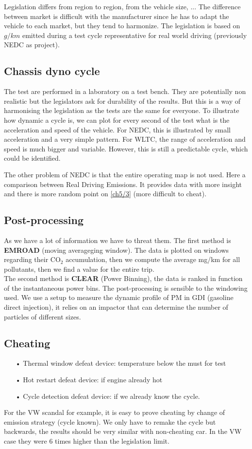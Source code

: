 	Legislation differs from region to region, from the vehicle size, ... The difference between market is difficult with the manufacturer since he has to adapt the vehicle to each market, but they tend to harmonize. The legislation is based on $g/km$ emitted during a test cycle representative for real world driving (previously NEDC as project). 
	
\subsection{Chassis dyno cycle}
		The test are performed in a laboratory on a test bench. They are potentially non realistic but the legislators ask for durability of the results. But this is a way of harmonising the legislation as the tests are the same for everyone. To illustrate how dynamic a cycle is, we can plot for every second of the test what is the acceleration and speed of the vehicle. For NEDC, this is illustrated by small acceleration and a very simple pattern. For WLTC, the range of acceleration and speed is much bigger and variable. However, this is still a predictable cycle, which could be identified.
		
		The other problem of NEDC is that the entire operating map is not used. Here a comparison between Real Driving Emissions. It provides data with more insight and there is more random point on \autoref{ch5/3} (more difficult to cheat).
		
\subsection{Post-processing}
	As we have a lot of information we have to threat them. The first method is \textbf{EMROAD} (moving averageging window). The data is plotted on windows regarding their CO$_2$ accumulation, then we compute the average mg/km for all pollutants, then we find a value for the entire trip. \\
	
	The second method is \textbf{CLEAR} (Power Binning), the data is ranked in function of the instantaneous power bins. The post-processing is sensible to the windowing used. We use a setup to measure the dynamic profile of PM in GDI (gasoline direct injection), it relies on an impactor that can determine the number of particles of different sizes. 
	
\subsection{Cheating}
	\begin{itemize}
	\item[•] Thermal window defeat device: temperature below the must for test
	\item[•] Hot restart defeat device: if engine already hot
	\item[•] Cycle detection defeat device: if we already know the cycle. \\
	\end{itemize}
	
	For the VW scandal for example, it is easy to prove cheating by change of emission strategy (cycle known). We only have to remake the cycle but backwards, the results should be very similar with non-cheating car. In the VW case they were 6 times higher than the legislation limit. 
	